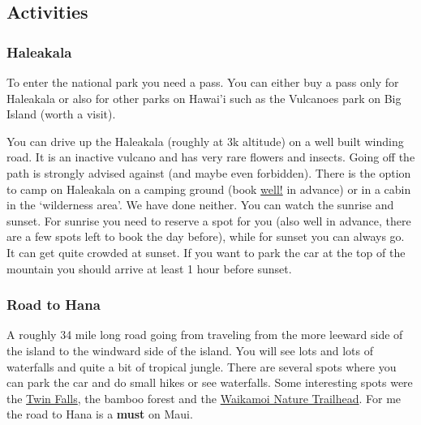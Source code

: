 \documentclass[11pt,a4paper,sans,english]{article}
\begin{document}
\subsection{Activities}
\subsubsection{Haleakala}
To enter the national park you need a pass. You can either buy a pass only for Haleakala or also for other parks on Hawai'i such as the Vulcanoes park on Big Island (worth a visit).

You can drive up the Haleakala (roughly at 3k altitude) on a well built winding road. It is an inactive vulcano and has very rare flowers and insects. Going off the path is strongly advised against (and maybe even forbidden). There is the option to camp on Haleakala on a camping ground (book \underline{well!} in advance) or in a cabin in the `wilderness area'. We have done neither.
You can watch the sunrise and sunset. For sunrise you need to reserve a spot for you (also well in advance, there are a few spots left to book the day before), while for sunset you can always go. It can get quite crowded at sunset. If you want to park the car at the top of the mountain you should arrive at least 1 hour before sunset.

\subsubsection{Road to Hana} 
A roughly 34 mile long road going from traveling from the more leeward side of the island to the windward side of the island. You will see lots and lots of waterfalls and quite a bit of tropical jungle. There are several spots where you can park the car and do small hikes or see waterfalls. Some interesting spots were the \href{https://www.google.com/maps/place/Twin+Falls+Maui+Waterfall/@20.911966,-156.243829,13z/data=!4m20!1m13!4m12!1m6!1m2!1s0x7954ac25622d34d3:0xfa34511da051c993!2sH%C4%81na,+Hawaii+96713,+USA!2m2!1d-155.9879885!2d20.7557169!1m3!2m2!1d-156.2660229!2d20.9115514!3e0!3m5!1s0x7eab357b40b6d0ed:0x51beb222d42815b3!8m2!3d20.9113614!4d-156.2439879!16s%2Fg%2F11cm_3x94j}{Twin Falls}, the bamboo forest and the \href{https://www.google.com/maps/place/Waikamoi+Nature+Trailhead+and+Parking+Area/@20.8755849,-156.1867716,15z/data=!4m20!1m13!4m12!1m6!1m2!1s0x7954ac25622d34d3:0xfa34511da051c993!2sH%C4%81na,+Hawaii+96713,+USA!2m2!1d-155.9879885!2d20.7557169!1m3!2m2!1d-156.2660229!2d20.9115514!3e0!3m5!1s0x7eab4b290067919f:0xca99a7f8e011c0c0!8m2!3d20.8755788!4d-156.1867851!16s%2Fg%2F1tcwrbwy}{Waikamoi Nature Trailhead}.
For me the road to Hana is a \textbf{must} on Maui.
\end{document}

